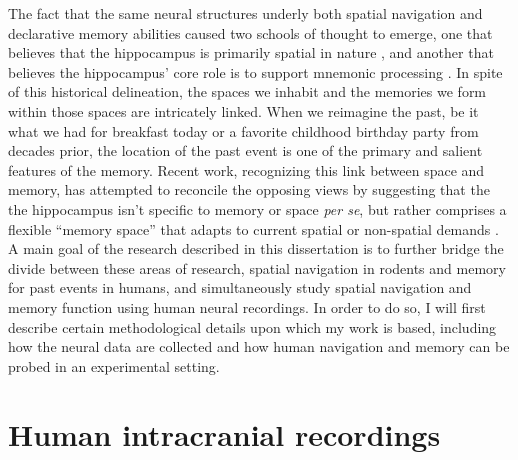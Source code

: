 The fact that the same neural structures underly both spatial navigation and declarative memory abilities caused two schools of thought to emerge, one that believes that the hippocampus is primarily spatial in nature \citep{OKeeNade78,HartEtal14}, and another that believes the hippocampus' core role is to support mnemonic processing \citep{CoheSqui80}. In spite of this historical delineation, the spaces we inhabit and the memories we form within those spaces are intricately linked. When we reimagine the past, be it what we had for breakfast today or a favorite childhood birthday party from decades prior, the location of the past event is one of the primary and salient features of the memory.  Recent work, recognizing this link between space and memory, has attempted to reconcile the opposing views by suggesting that the the hippocampus isn't specific to memory or space \textit{per se}, but rather comprises a flexible ``memory space'' that adapts to current spatial or non-spatial demands \citep{EichEtal99,EichCohe14}. A main goal of the research described in this dissertation is to further bridge the divide between these areas of research, spatial navigation in rodents and memory for past events in humans, and simultaneously study spatial navigation and memory function using human neural recordings. In order to do so, I will first describe certain methodological details upon which my work is based, including how the neural data are collected and how human navigation and memory can be probed in an experimental setting.









\section{Human intracranial recordings}

